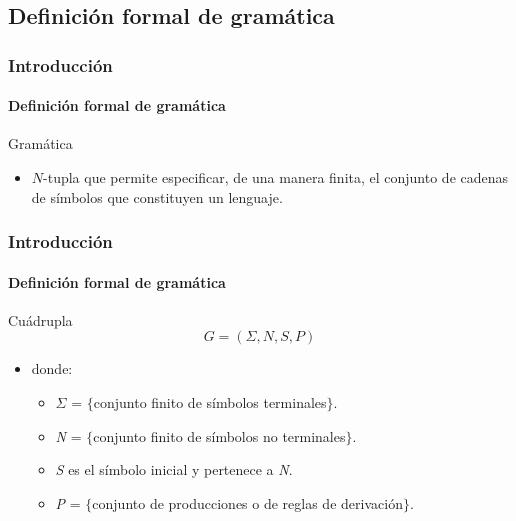 \documentclass{beamer}
\begin{document}
        \subsection{Definici\'on formal de gram\'atica}

        \begin{frame}
            \frametitle{Introducci\'on}
            \framesubtitle{Definici\'on formal de gram\'atica}

            \begin{block}{Gram\'atica}
                \begin{itemize}
                    \item[\checkmark] $N$-tupla que permite especificar, de una manera finita, el conjunto de cadenas de s\'imbolos que constituyen un lenguaje.
                \end{itemize}
			\end{block}
		\end{frame}

        \begin{frame}
            \frametitle{Introducci\'on}
            \framesubtitle{Definici\'on formal de gram\'atica}

            \begin{alertblock}{Cu\'adrupla}
                $$G = (\Sigma, N, S , P)$$
                \begin{itemize}
                    \item[] donde:
                    \begin{itemize}
                        \item[\checkmark] $\Sigma$ = $\{$conjunto finito de s\'imbolos terminales$\}$.
                        \item[\checkmark] \emph{N} = $\{$conjunto finito de s\'imbolos no terminales$\}$.
                        \item[\checkmark] \emph{S} es el s\'imbolo inicial y pertenece a \emph{N}.
                        \item[\checkmark] \emph{P} = $\{$conjunto de producciones o de reglas de derivaci\'on$\}$.
                    \end{itemize}
                \end{itemize}
			\end{alertblock}
		\end{frame}
\end{document}
